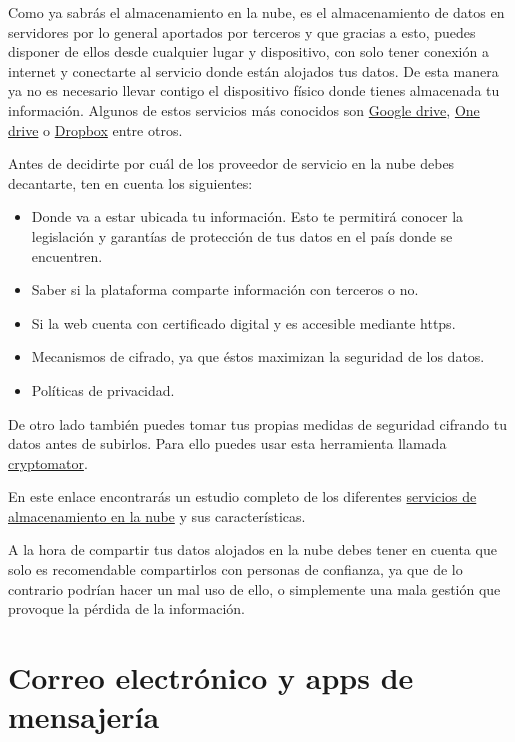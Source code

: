 \documentclass[
  a4paper,
  openany]{book}
\begin{document}
Como ya sabrás el almacenamiento en la nube, es el almacenamiento de datos en servidores por lo general aportados por terceros y que gracias a esto, puedes disponer de ellos desde cualquier lugar y dispositivo, con solo tener conexión a internet y conectarte al servicio donde están alojados tus datos. De esta manera ya no es necesario llevar contigo el dispositivo físico donde tienes almacenada tu información. Algunos de estos servicios más conocidos son \href{https://www.google.com/intl/en_in/drive/}{Google drive}, \href{https://www.microsoft.com/en-us/microsoft-365/onedrive/online-cloud-storage}{One drive} o \href{https://www.dropbox.com/}{Dropbox} entre otros.

Antes de decidirte por cuál de los proveedor de servicio en la nube debes decantarte, ten en cuenta los siguientes:

\begin{itemize}
\item
  Donde va a estar ubicada tu información. Esto te permitirá conocer la legislación y
  garantías de protección de tus datos en el país donde se encuentren.
\item
  Saber si la plataforma comparte información con terceros o no.
\item
  Si la web cuenta con certificado digital y es accesible mediante https.
\item
  Mecanismos de cifrado, ya que éstos maximizan la seguridad de los datos.
\item
  Políticas de privacidad.
\end{itemize}

De otro lado también puedes tomar tus propias medidas de seguridad cifrando tu datos antes de subirlos. Para ello puedes usar esta herramienta llamada \href{https://cryptomator.org/}{cryptomator}.

En este enlace encontrarás un estudio completo de los diferentes \href{https://www.osi.es/sites/default/files/docs/osi_servicios_nube.pdf}{servicios de almacenamiento en la nube} y sus características.

A la hora de compartir tus datos alojados en la nube debes tener en cuenta que solo es recomendable compartirlos con personas de confianza, ya que de lo contrario podrían hacer un mal uso de ello, o simplemente una mala gestión que provoque la pérdida de la información.

\hypertarget{correo-electruxf3nico-y-apps-de-mensajeruxeda}{%
\section{Correo electrónico y apps de mensajería}\label{correo-electruxf3nico-y-apps-de-mensajeruxeda}}
\end{document}
